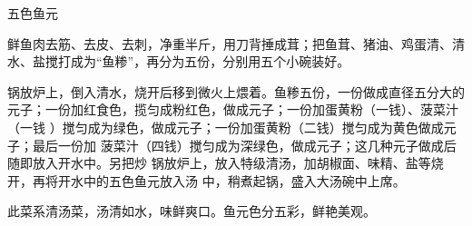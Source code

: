 \begin{recipe}[五福鱼元]{五色鱼元}

\ingredients


\preparation

\step 鲜鱼肉去筋、去皮、去刺，净重半斤，用刀背捶成茸；把鱼茸、猪油、鸡蛋清、清
水、盐搅打成为“鱼糁”，再分为五份，分别用五个小碗装好。

\step 锅放炉上，倒入清水，烧开后移到微火上煨着。鱼糁五份，一份做成直径五分大的
元子；一份加红食色，揽匀成粉红色，做成元子；一份加蛋黄粉（一钱）、菠菜汁（一钱
）搅匀成为绿色，做成元子；一份加蛋黄粉（二钱）搅匀成为黄色做成元子；最后一份加
菠菜汁（四钱）搅匀成为深绿色，做成元子；这几种元子做成后随即放入开水中。另把炒
锅放炉上，放入特级清汤，加胡椒面、味精、盐等烧开，再将开水中的五色鱼元放入汤
中，稍煮起锅，盛入大汤碗中上席。

\features

此菜系清汤菜，汤清如水，味鲜爽口。鱼元色分五彩，鲜艳美观。

\end{recipe}

